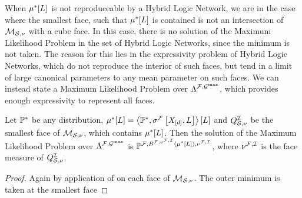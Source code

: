 When $\mu^*[L]$ is not reproduceable by a Hybrid Logic Network, we are in the case where the smallest face, such that $\mu^*[L]$ is contained is not an intersection of $\mathcal{M}_{\mathcal{S},\nu}$ with a cube face.
In this case, there is no solution of the Maximum Likelihood Problem  in the set of Hybrid Logic Networks, since the minimum is not taken.
The reason for this lies in the expressivity problem of Hybrid Logic Networks, which do not reproduce the interior of such faces, but tend in a limit of large canonical parameters to any mean parameter on such faces.
We can instead state a Maximum Likelihood Problem over $\Lambda^{\mathcal{F},\mathcal{G}^{\mathrm{max}}}$, which provides enough expressivity to represent all faces.

\begin{theorem}
    Let $\mathbb{P}^*$ be any distribution, $\mu^*[L]=\left\langle \mathbb{P}^*,\sigma^{\mathcal{F}}\left[X_{[d]},L\right]\right\rangle \left[ L \right]$ and $Q^{\mathcal{I}}_{\mathcal{S},\nu}$ be the smallest face of $\mathcal{M}_{\mathcal{S},\nu}$, which contains $\mu^*[L]$.
    Then the solution of the Maximum Likelihood Problem  over $\Lambda^{\mathcal{F},\mathcal{G}^{\mathrm{max}}}$ is $\mathbb{P}^{\mathcal{F},B^{\mathcal{F},\nu^{\mathcal{F},\mathcal{I}}}(\mu^*[L]),\nu^{\mathcal{F},\mathcal{I}}}$, where $\nu^{\mathcal{F},\mathcal{I}}$ is the face measure of $Q^{\mathcal{I}}_{\mathcal{S},\nu}$.
\end{theorem}
\begin{proof}
    Again by application of  on each face of $\mathcal{M}_{\mathcal{S},\nu}$.
    The outer minimum is taken at the smallest face
\end{proof}


